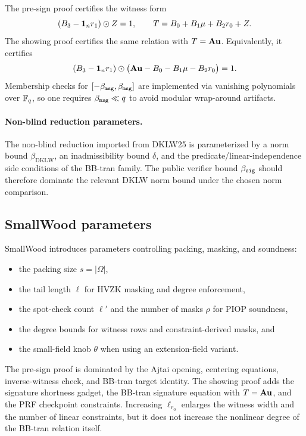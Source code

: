 The pre-sign proof certifies the witness form
\[
  (B_3-\mathbf 1_n r_1)\odot Z=1,
  \qquad
  T=B_0+B_1\mathbf{\mu}+B_2r_0+Z.
\]
The showing proof certifies the same relation with $T=\mathbf{A}\mathbf{u}$.  Equivalently, it certifies
\[
  (B_3-\mathbf 1_n r_1)\odot\bigl(\mathbf{A}\mathbf{u}-B_0-B_1\mathbf{\mu}-B_2r_0\bigr)=1.
\]
Membership checks for $[-\beta_{\mathtt{msg}},\beta_{\mathtt{msg}}]$ are implemented via vanishing polynomials over $\mathbb{F}_q$, so one
requires $\beta_{\mathtt{msg}}\ll q$ to avoid modular wrap-around artifacts.

\paragraph{Non-blind reduction parameters.}
The non-blind reduction imported from DKLW25 is parameterized by a norm bound $\beta_{\mathrm{DKLW}}$, an
inadmissibility bound $\delta$, and the predicate/linear-independence side conditions of the BB-tran family.  The
public verifier bound $\beta_{\mathtt{sig}}$ should therefore dominate the relevant DKLW norm bound under the chosen norm
comparison.

\subsection{SmallWood parameters}
SmallWood introduces parameters controlling packing, masking, and soundness:
\begin{itemize}[leftmargin=1.25em]
  \item the packing size $s=|\Omega|$,
  \item the tail length $\ell$ for HVZK masking and degree enforcement,
  \item the spot-check count $\ell'$ and the number of masks $\rho$ for PIOP soundness,
  \item the degree bounds for witness rows and constraint-derived masks, and
  \item the small-field knob $\theta$ when using an extension-field variant.
\end{itemize}
The pre-sign proof is dominated by the Ajtai opening, centering equations, inverse-witness check, and BB-tran target
identity.  The showing proof adds the signature shortness gadget, the BB-tran signature equation with
$T=\mathbf{A}\mathbf{u}$, and the PRF checkpoint constraints.  Increasing $\ell_{r_0}$ enlarges the witness width and the
number of linear constraints, but it does not increase the nonlinear degree of the BB-tran relation itself.


